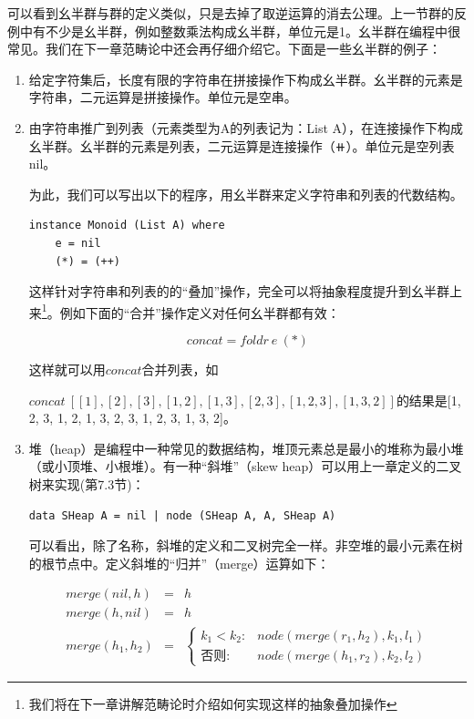 \documentclass[b5paper]{ctexart}
\begin{document}
可以看到幺半群与群的定义类似，只是去掉了取逆运算的消去公理。上一节群的反例中有不少是幺半群，例如整数乘法构成幺半群，单位元是1。幺半群在编程中很常见。我们在下一章范畴论中还会再仔细介绍它。下面是一些幺半群的例子：

\begin{enumerate}
\item 给定字符集后，长度有限的字符串在拼接操作下构成幺半群。幺半群的元素是字符串，二元运算是拼接操作。单位元是空串。
\item 由字符串推广到列表（元素类型为A的列表记为：List A），在连接操作下构成幺半群。幺半群的元素是列表，二元运算是连接操作（$\doubleplus$）。单位元是空列表nil。

为此，我们可以写出以下的程序，用幺半群来定义字符串和列表的代数结构。

\begin{lstlisting}
instance Monoid (List A) where
    e = nil
    (*) = (++)
\end{lstlisting}

这样针对字符串和列表的的“叠加”操作，完全可以将抽象程度提升到幺半群上来\footnote{我们将在下一章讲解范畴论时介绍如何实现这样的抽象叠加操作}。例如下面的“合并”操作定义对任何幺半群都有效：

\[
concat = foldr\ e\ (*)
\]

这样就可以用$concat$合并列表，如

$concat\ [[1], [2], [3], [1, 2], [1, 3], [2, 3], [1, 2, 3], [1, 3, 2]]$的结果是[1, 2, 3, 1, 2, 1, 3, 2, 3, 1, 2, 3, 1, 3, 2]。

\item 堆（heap）是编程中一种常见的数据结构，堆顶元素总是最小的堆称为最小堆（或小顶堆、小根堆）。有一种“斜堆”（skew heap）可以用上一章定义的二叉树来实现(\cite{LiuXinyu2017}第7.3节)：

\begin{lstlisting}
data SHeap A = nil | node (SHeap A, A, SHeap A)
\end{lstlisting}

可以看出，除了名称，斜堆的定义和二叉树完全一样。非空堆的最小元素在树的根节点中。定义斜堆的“归并”（merge）运算如下：

\[
\begin{array}{rcl}
merge(nil, h) & = & h \\
merge(h, nil) & = & h \\
merge(h_1, h_2) & = &
  \begin{cases}
  k_1 < k_2 : & node(merge(r_1, h_2), k_1, l_1) \\
  \text{否则}: & node(merge(h_1, r_2), k_2, l_2)
  \end{cases}
\end{array}
\]


\end{enumerate}
\end{document}
